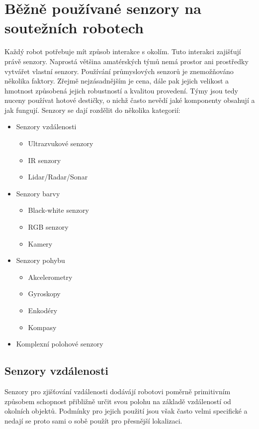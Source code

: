 \chapter{Běžně používané senzory na soutežních robotech}

Každý robot potřebuje mít způsob interakce s okolím.
Tuto interakci zajišťují právě senzory.
Naprostá většina amatérských týmů nemá prostor ani prostředky vytvářet vlastní senzory.
Používání průmyslových senzorů je znemožňováno několika faktory.
Zřejmě nejzásadnějším je cena, dále pak jejich velikost a hmotnost způsobená jejich robustností a kvalitou provedení.
Týmy jsou tedy nuceny používat hotové destičky, o nichž často nevědí jaké komponenty obsahují a jak fungují.
Senzory se dají rozdělit do několika kategorií:
\begin{itemize}
    \item Senzory vzdálenosti
        \begin{itemize}
            \item Ultrazvukové senzory
            \item IR senzory
            \item Lidar/Radar/Sonar
        \end{itemize}
    \item Senzory barvy
        \begin{itemize}
            \item Black-white senzory
            \item RGB senzory
            \item Kamery
        \end{itemize}
    \item Senzory pohybu
        \begin{itemize}
            \item Akcelerometry
            \item Gyroskopy
            \item Enkodéry
            \item Kompasy
        \end{itemize}
    \item Komplexní polohové senzory
\end{itemize}

\section{Senzory vzdálenosti}

Senzory pro zjišťování vzdálenosti dodávájí robotovi poměrně primitivním způsobem schopnost přibližně určit svou polohu na základě vzdáleností od okolních objektů.
Podmínky pro jejich použití jsou však často velmi specifické a nedají se proto sami o sobě použít pro přesnější lokalizaci.

